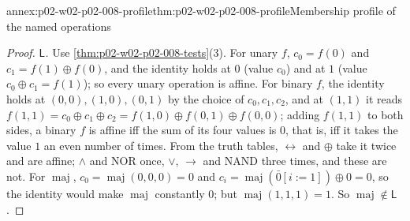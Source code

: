 \begin{annexitem}{annex:p02-w02-p02-008-profile}{thm:p02-w02-p02-008-profile}{Membership profile of the named operations}
\begin{proof}
\emph{\(\mathsf L\).}  Use \cref{thm:p02-w02-p02-008-tests}(3).  For unary
\(f\), \(c_0=f(0)\) and \(c_1=f(1)\oplus f(0)\), and the identity holds at
\(0\) (value \(c_0\)) and at \(1\) (value \(c_0\oplus c_1=f(1)\)); so every
unary operation is affine.  For binary \(f\), the identity holds at
\((0,0),(1,0),(0,1)\) by the choice of \(c_0,c_1,c_2\), and at \((1,1)\) it
reads \(f(1,1)=c_0\oplus c_1\oplus c_2=f(1,0)\oplus f(0,1)\oplus f(0,0)\);
adding \(f(1,1)\) to both sides, a binary \(f\) is affine iff the sum of its
four values is \(0\), that is, iff it takes the value \(1\) an even number
of times.  From the truth tables, \(\leftrightarrow\) and \(\oplus\) take it
twice and are affine; \(\land\) and \(\mathrm{NOR}\) once, \(\lor\), \(\to\)
and \(\mathrm{NAND}\) three times, and these are not.  For
\(\operatorname{maj}\), \(c_0=\operatorname{maj}(0,0,0)=0\) and
\(c_i=\operatorname{maj}(\bar0[i{:=}1])\oplus0=0\), so the identity would
make \(\operatorname{maj}\) constantly \(0\); but
\(\operatorname{maj}(1,1,1)=1\).  So \(\operatorname{maj}\notin\mathsf L\).
\end{proof}
\end{annexitem}

